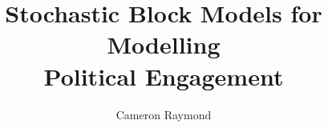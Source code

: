 

%





\title{Stochastic Block Models for Modelling \\[1ex]Political Engagement}

\author{Cameron Raymond}


\figurespagefalse
\tablespagefalse

\beforepreface




